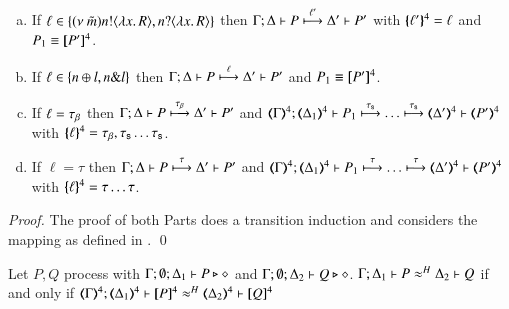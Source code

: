 \begin{proposition}
\begin{enumerate}
\begin{enumerate}[a)]
				\item	If $\ell \in \{(\nu\ \tilde{m}) n ! \langle \lambda x.\,R \rangle, n ? \langle \lambda x.\,R \rangle\}$
					then
					$\Gamma; \Delta \vdash P \stackrel{\ell'}{\longmapsto} \Delta' \vdash P'$
					with $\{\!\!\{\ell'\}\!\!\}^{4} = \ell$ and $P_1 \equiv [\!\![P']\!\!]^{4}$.

				\item	If $\ell \in \{n \oplus l, n \& l\}$
					then
					$\Gamma; \Delta \vdash P \stackrel{\ell}{\longmapsto} \Delta' \vdash P'$ and $P_1 \equiv [\!\![P']\!\!]^{4}$.

				\item	If $\ell = \tau_{\beta}$ then
					$\Gamma; \Delta \vdash P \stackrel{\tau_{\beta}}{\longmapsto} \Delta' \vdash P'$ and
					$\horel{\tmap{\Gamma}{4}}{\tmap{\Delta_1}{4}}{P_1}{\hby{\stau} \dots \hby{\stau}}
					{\tmap{\Delta'}{4}}{\tmap{P'}{4}}$ with $\{\!\!\{\ell\}\!\!\}^{4} = \tau_{\beta}, \tau_{\mathsf{s}} \dots \tau_{\mathsf{s}}$.

				\item	If $\ell = \tau$ then
					$\Gamma; \Delta \vdash P \stackrel{\tau}{\longmapsto} \Delta' \vdash P'$ and
					$\horel{\tmap{\Gamma}{4}}{\tmap{\Delta_1}{4}}{P_1}{\hby{\tau} \dots \hby{\tau}}
					{\tmap{\Delta'}{4}}{\tmap{P'}{4}}$ with $\{\!\!\{\ell\}\!\!\}^{4} = \tau \dots \tau$.
			\end{enumerate}
	\end{enumerate}
\end{proposition}

\begin{proof}
	The proof of both Parts does a transition induction and
	considers the mapping as defined in .
\else\fi
	\qed
\end{proof}


\begin{proposition}\rm
	\label{prop:fulla:pHOp_to_HOp}
	Let $P, Q$ \pHOp process with $\Gamma; \emptyset; \Delta_1 \vdash P \triangleright \diamond$ and 
	$\Gamma; \emptyset; \Delta_2 \vdash Q \triangleright \diamond$.
	$\Gamma; \Delta_1 \vdash P \approx^{H} \Delta_2 \vdash Q$ if and only if $\horel{\tmap{\Gamma}{4}}{\tmap{\Delta_1}{4}}{\pmap{P}{4}}{\wb}{\tmap{\Delta_2}{4}}{\pmap{Q}{4}}$
\end{proposition}

